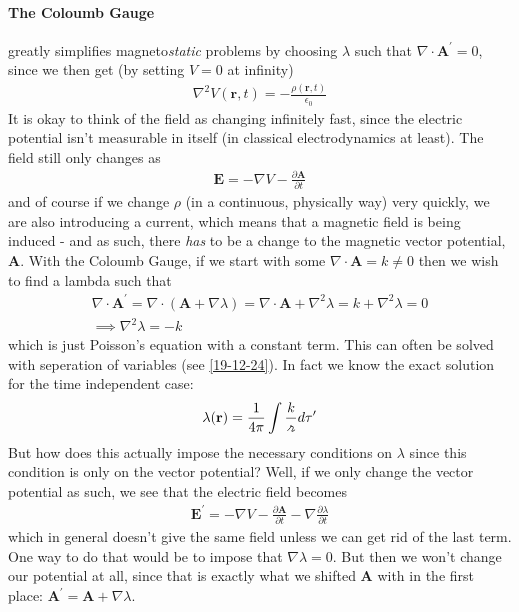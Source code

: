 \paragraph{The Coloumb Gauge} greatly simplifies magneto\textit{static} problems by choosing \(\lambda \) such that \(\nabla \cdot \mathbf{A}^{\prime}  = 0\), since we then get (by setting \(V = 0\) at infinity) \begin{align*}
    \nabla ^{2} V(\mathbf{r}, t) = -\frac{\rho(\mathbf{r} ,t)}{\epsilon _0}
\end{align*} 
It is okay to think of the field as changing infinitely fast, since the electric potential isn't measurable in itself (in classical electrodynamics at least). The field still only changes as \begin{align*}
    \mathbf{E} = - \nabla V - \frac{\partial \mathbf{A}}{\partial t} 
\end{align*}
and of course if we change \(\rho\) (in a continuous, physically way) very quickly, we are also introducing a current, which means that a magnetic field is being induced - and as such, there \textit{has} to be a change to the magnetic vector potential, \(\mathbf{A}\). With the Coloumb Gauge, if we start with some \(\nabla \cdot \mathbf{A} = k \neq 0\) then we wish to find a lambda such that \begin{gather*}
    \nabla \cdot \mathbf{A}^{\prime}  = \nabla \cdot \left( \mathbf{A} + \nabla \lambda \right) = \nabla \cdot \mathbf{A} + \nabla ^{2} \lambda = k + \nabla ^{2} \lambda = 0\\
    \implies \nabla ^{2} \lambda = -k
\end{gather*}  
which is just Poisson's equation with a constant term. This can often be solved with seperation of variables (see \ref{19-12-24}). In fact we know the exact solution for the time independent case: \begin{align*}
    \lambda (\mathbf{r}) = \frac{1}{4\pi}  \int \frac{k}{\griffr[2]} d \tau ^{\prime} 
\end{align*}But how does this actually impose the necessary conditions on \(\lambda \) since this condition is only on the vector potential? Well, if we only change the vector potential as such, we see that the electric field becomes \begin{align*}
    \mathbf{E}^{\prime} = - \nabla V - \frac{\partial \mathbf{A}}{\partial t} - \nabla \frac{\partial \lambda }{\partial t} 
\end{align*}
which in general doesn't give the same field unless we can get rid of the last term. One way to do that would be to impose that \(\nabla \lambda = 0\). But then we won't change our potential at all, since that is exactly what we shifted \(\mathbf{A}\) with in the first place: \(\mathbf{A}^{\prime} = \mathbf{A} + \nabla \lambda \). 

